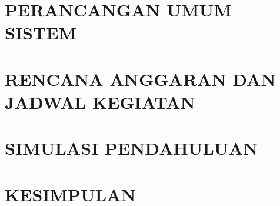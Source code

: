 \documentclass{data/example/DTETI_Capstone_C251}
\begin{document}
\chapter{\uppercase{Perancangan Umum Sistem}}
\label{chap:Perancangan_Umum_Sistem}


\chapter{\uppercase{Rencana Anggaran dan Jadwal Kegiatan}}
\label{chap:RAB_JadwalKegiatan}


\chapter{\uppercase{Simulasi Pendahuluan}}
\label{chap:Simulasi_Pendahuluan}


\chapter{\uppercase{Kesimpulan}}
\label{chap:Kesimpulan}


\begin{thebibliography}{}
    
\end{thebibliography}

\end{document}
